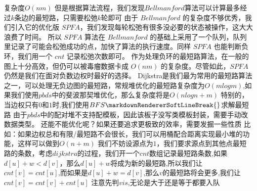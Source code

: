 {}复杂度$ O(nm) $\markdownRendererParagraphSeparator
{}但是根据算法流程，我们发现$ Bellmanford $算法可以计算最多经过$ k $条边的最短路，只需要松弛$ k $轮即可\markdownRendererInterblockSeparator
{}\markdownRendererInterblockSeparator
{}
\markdownRendererSectionEnd \markdownRendererSectionBegin
{}\markdownRendererInterblockSeparator
{}由于 $Bellmanford$ 的复杂度不够优秀，我们引入它的优化版 $SPFA$，我们发现每轮松弛有很多没必要的状态被操作，这大大浪费了时间。\markdownRendererParagraphSeparator
{}所以 $SPFA$ 算法在 $Bellmanford$ 的基础上采用了一个队列，队列里记录了可能会松弛成功的点，加快了算法的执行速度。同样 $SPFA$ 也能判断负环，我们用一个 $cnt$ 记录松弛次数即可。\markdownRendererParagraphSeparator
{}作为处理负环的最短路算法，在一般的图上十分高效，但仍可以被毒瘤数据卡成 $O(nm)$ 的复杂度。尽管如此，$SPFA$ 仍然是我们在面对负数边权时最好的选择。\markdownRendererInterblockSeparator
{}\markdownRendererInterblockSeparator
{}
\markdownRendererSectionEnd \markdownRendererSectionBegin
{}\markdownRendererInterblockSeparator
{}Dijkstra是我们最为常用的最短路算法之一，可以处理无负边图的最短路，常规堆优化的最短路复杂度为$ O(mlogm) $,如果我们使用$ pbds $中的斐波那契堆优化，那么复杂度将是$ O(nlogn+m) $\markdownRendererParagraphSeparator
{}特别的，当边权只有$ 0 $和$ 1 $时,我们使用$ BFS\markdownRendererSoftLineBreak
{}$求解最短路\markdownRendererParagraphSeparator
{}由于$ pbds $中的配对堆不支持配模板，因此该板子没写类模板封装，需要手动改数据类型。\markdownRendererInterblockSeparator
{}\markdownRendererInterblockSeparator
{}还能不能优化呢？如果还要追求更极致的效率，需要发掘一些性质\markdownRendererParagraphSeparator
{}比如：如果边权总和有限/最短路不会很长，我们可以用桶配合距离实现最小堆的功能，这样可以做到$ O(n+m) $\markdownRendererInterblockSeparator
{}
\markdownRendererSectionEnd \markdownRendererSectionBegin
{}\markdownRendererInterblockSeparator
{}我们不妨设源点为$ 1 $，我们要求源点到其他点最短路的条数，考虑$ dijkstra $的过程，我们开一个$ cnt $数组记录最短路条数,如果$ d[u]+w<d[v] $，那么$ d[u]+w $将成为新的最短路,所以我们让$ cnt[v]=cnt[u] $,而如果是$ d[u]+w=d[v] $,那么$ v $的最短路将会更多,我们让$ cnt[v]=cnt[v]+cnt[u] $\markdownRendererParagraphSeparator
{}注意先判$ vis $,无论是大于还是等于都要入队\markdownRendererInterblockSeparator
